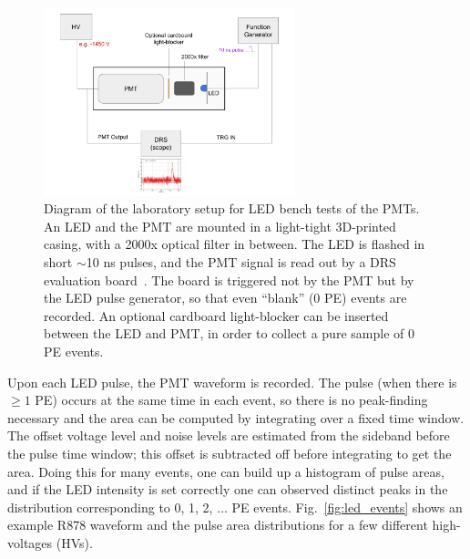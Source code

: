{\begin{figure}[t]
  \begin{center}
    \includegraphics[width=0.650\textwidth]{figs/milliq/pmt_setup.pdf}
    \caption{Diagram of the laboratory setup for LED bench tests of the PMTs.
      An LED and the PMT are mounted in a light-tight 3D-printed casing,
      with a 2000x optical filter in between. The LED is flashed in
      short $\sim$10 ns pulses, and the PMT signal is read out by
      a DRS evaluation board~\cite{drs}. The board is triggered not by the 
      PMT but by the LED pulse generator, so that even ``blank'' (0 PE) events
      are recorded. An optional cardboard light-blocker can be inserted between
      the LED and PMT, in order to collect a pure sample of 0 PE events.
            }
    \label{fig:pmt_setup}
  \end{center}
\end{figure}

Upon each LED pulse, the PMT waveform is recorded. The pulse (when there is $\geq1$ PE)
occurs at the same time in each event, so there is no peak-finding necessary and the 
area can be computed by integrating over a fixed time window. The offset voltage level
and noise levels are estimated from the sideband before the pulse time window; this offset
is subtracted off before integrating to get the area. Doing this for many
events, one can build up a histogram of pulse areas, and if the LED intensity is
set correctly one can observed distinct peaks in the distribution corresponding
to 0, 1, 2, $\dots$ PE events. Fig.~\ref{fig:led_events} shows an example
R878 waveform and the pulse area distributions for a few different 
high-voltages (HVs).

}
